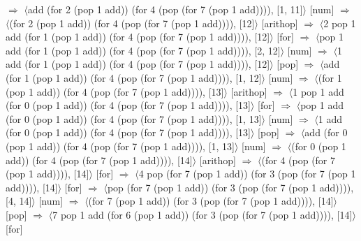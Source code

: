\documentclass[12pt]{report}
\begin{document}
$\Rightarrow$ $\langle$add (for 2 (pop 1 add)) (for 4 (pop (for 7 (pop 1 add)))), [1, 11]$\rangle$ \hfill [num] \newline
$\Rightarrow$ $\langle$(for 2 (pop 1 add)) (for 4 (pop (for 7 (pop 1 add)))), [12]$\rangle$ \hfill [arithop] \newline
$\Rightarrow$ $\langle$2 pop 1 add (for 1 (pop 1 add)) (for 4 (pop (for 7 (pop 1 add)))), [12]$\rangle$ \hfill [for] \newline
$\Rightarrow$ $\langle$pop 1 add (for 1 (pop 1 add)) (for 4 (pop (for 7 (pop 1 add)))), [2, 12]$\rangle$ \hfill [num] \newline
$\Rightarrow$ $\langle$1 add (for 1 (pop 1 add)) (for 4 (pop (for 7 (pop 1 add)))), [12]$\rangle$ \hfill [pop] \newline
$\Rightarrow$ $\langle$add (for 1 (pop 1 add)) (for 4 (pop (for 7 (pop 1 add)))), [1, 12]$\rangle$ \hfill [num] \newline
$\Rightarrow$ $\langle$(for 1 (pop 1 add)) (for 4 (pop (for 7 (pop 1 add)))), [13]$\rangle$ \hfill [arithop] \newline
$\Rightarrow$ $\langle$1 pop 1 add (for 0 (pop 1 add)) (for 4 (pop (for 7 (pop 1 add)))), [13]$\rangle$ \hfill [for] \newline
$\Rightarrow$ $\langle$pop 1 add (for 0 (pop 1 add)) (for 4 (pop (for 7 (pop 1 add)))), [1, 13]$\rangle$ \hfill [num] \newline
$\Rightarrow$ $\langle$1 add (for 0 (pop 1 add)) (for 4 (pop (for 7 (pop 1 add)))), [13]$\rangle$ \hfill [pop] \newline
$\Rightarrow$ $\langle$add (for 0 (pop 1 add)) (for 4 (pop (for 7 (pop 1 add)))), [1, 13]$\rangle$ \hfill [num] \newline
$\Rightarrow$ $\langle$(for 0 (pop 1 add)) (for 4 (pop (for 7 (pop 1 add)))), [14]$\rangle$ \hfill [arithop] \newline
$\Rightarrow$ $\langle$(for 4 (pop (for 7 (pop 1 add)))), [14]$\rangle$ \hfill [for] \newline
$\Rightarrow$ $\langle$4 pop (for 7 (pop 1 add)) (for 3 (pop (for 7 (pop 1 add)))), [14]$\rangle$ \hfill [for] \newline
$\Rightarrow$ $\langle$pop (for 7 (pop 1 add)) (for 3 (pop (for 7 (pop 1 add)))), [4, 14]$\rangle$ \hfill [num] \newline
$\Rightarrow$ $\langle$(for 7 (pop 1 add)) (for 3 (pop (for 7 (pop 1 add)))), [14]$\rangle$ \hfill [pop] \newline
$\Rightarrow$ $\langle$7 pop 1 add (for 6 (pop 1 add)) (for 3 (pop (for 7 (pop 1 add)))), [14]$\rangle$ \hfill [for] \newline
\end{document}
